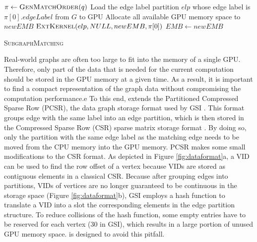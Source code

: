 \begin{algorithm}[t!]
  $\pi \leftarrow \textsc{GenMatchOrder}(q)$\;
Load the edge label partition $elp$ whose edge label is $\pi[0].edgeLabel$ from $G$ to GPU\; Allocate all available GPU memory space to
$newEMB$\; $\textsc{ExtKernel}(elp,NULL,newEMB,\pi[0])$\; $EMB \leftarrow newEMB$\;  \caption{\textsc{SubgraphMatching}} \label{algo:submatch}
\end{algorithm}


%
Real-world graphs are often too large to fit into the memory of a single GPU. Therefore, only part of the data that is needed for the
current computation should be stored in the GPU memory at a given time. As a result, it is important to find a compact representation of
the graph data without compromising the computation performance.e To this end, \SystemName extends the Partitioned Compressed Sparse Row
(PCSR), the data graph storage format used by GSI \cite{zeng2020gsi}. This format groups edge with the same label into an edge partition,
which is then stored in the Compressed Sparse Row (CSR) sparse matrix storage format \FIXME{\cite{}}. By doing so, only the partition with
the same edge label as the matching edge needs to be moved from the CPU memory into the GPU memory. PCSR makes some small modifications to
the CSR format. As depicted in Figure \ref{fig:dataformat}a, a VID can be used to find the row offset of a vertex because VIDs are stored
as contiguous elements in a classical CSR. Because after grouping edges into partitions, VIDs of vertices are no longer guaranteed to be
continuous in the storage space (Figure \ref{fig:dataformat}b), GSI employs a hash function to translate a VID into a slot the
corresponding elements in the edge partition structure. To reduce collisions of the hash function, some empty entries have to be reserved
for each vertex (30 in GSI), which results in a large portion of unused GPU memory space. \SystemName is designed to avoid this pitfall.


